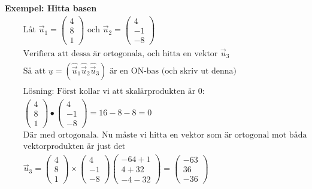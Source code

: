 \textbf{Exempel: Hitta basen}
\begin{align*} 
  &\quad  \text{Låt }
  \vec{u}_1 = \begin{pmatrix} 4 \\ 8 \\ 1 \end{pmatrix} \text{ och }
  \vec{u}_2 = \begin{pmatrix} 4 \\ -1 \\ -8 \end{pmatrix} \\
  &\quad  \text{Verifiera att dessa är ortogonala, och hitta en vektor } \vec{u}_3 \\
  &\quad  \text{Så att } \underline{u} = (\hat\vec{u}_1 \hat\vec{u}_2 \hat\vec{u}_3)
  \text{ är en ON-bas (och skriv ut denna)} \\
  &\quad  \\
  &\quad  \text{Lösning: Först kollar vi att skalärprodukten är } 0: \\
  &\quad
  \begin{pmatrix} 4 \\ 8 \\ 1 \end{pmatrix} \bullet \begin{pmatrix} 4 \\ -1 \\ -8 \end{pmatrix}
  = 16-8-8=0 \\
  &\quad  \text{Där med ortogonala. Nu måste vi hitta en vektor som är ortogonal mot båda } \\
  &\quad  \text{vektorprodukten är just det } \\
  &\quad  \vec{u}_3 =
  \begin{pmatrix} 4 \\ 8 \\ 1 \end{pmatrix} \times \begin{pmatrix} 4 \\ -1 \\ -8 \end{pmatrix}
  \begin{pmatrix} -64+1 \\ 4+32 \\ -4-32 \end{pmatrix} =
  \begin{pmatrix} -63 \\ 36 \\ -36 \end{pmatrix} \\

\end{align*}
